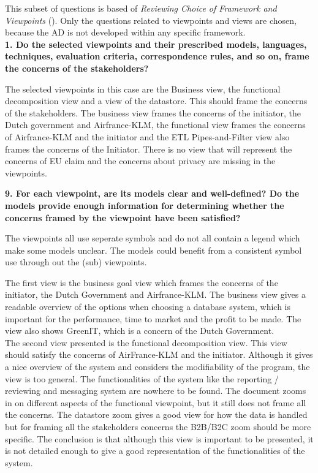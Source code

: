 This subset of questions is based of \emph{Reviewing Choice of Framework and Viewpoints} (\cite{tyree}). Only the questions related to viewpoints and views are chosen, because the AD is not developed within any specific framework.\\

\textbf{1. Do the selected viewpoints and their prescribed models, languages, techniques, evaluation criteria, correspondence rules, and so on, frame the concerns of the stakeholders?}

The selected viewpoints in this case are the Business view, the functional decomposition view and a view of the datastore. This should frame the concerns of the stakeholders. The business view frames the concerns of the initiator, the Dutch government and Airfrance-KLM, the functional view frames the concerns of Airfrance-KLM and the initiator and the ETL Pipes-and-Filter view also frames the concerns of the Initiator. There is no view that will represent the concerns of EU claim and the concerns about privacy are missing in the viewpoints. 
 
\vspace{.5cm}

\textbf{9. For each viewpoint, are its models clear and well-defined? Do the models provide enough information for determining whether the concerns framed by the viewpoint have been satisfied?}

The viewpoints all use seperate symbols and do not all contain a legend which make some models unclear. The models could benefit from a consistent symbol use through out the (sub) viewpoints.

The first view is the business goal view which frames the concerns of the initiator, the Dutch Government and Airfrance-KLM. The business view gives a readable overview of the options when choosing a database system, which is important for the performance, time to market and the profit to be made. The view also shows GreenIT, which is a concern of the Dutch Government. \\

The second view presented is the functional decomposition view.  This view should satisfy the concerns of AirFrance-KLM and the initiator. Although it gives a nice overview of the system and considers the modifiability of the program, the view is too general. The functionalities of the system like the reporting / reviewing and messaging system are nowhere to be found. The document zooms in on different aspects of the functional viewpoint, but it still does not frame all the concerns. The datastore zoom gives a good view for how the data is handled but for framing all the stakeholders concerns the B2B/B2C zoom should be more specific. The conclusion is that although this view is important to be presented, it is not detailed enough to give a good representation of the functionalities of the system.\\

